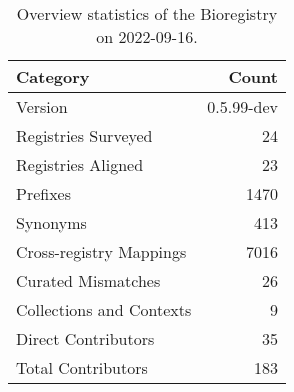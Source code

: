 \begin{table}
\centering
\caption{Overview statistics of the Bioregistry on 2022-09-16.}
\label{tab:bioregistry-summary}
\begin{tabular}{lr}
\toprule
                Category &      Count \\
\midrule
                 Version & 0.5.99-dev \\
     Registries Surveyed &         24 \\
      Registries Aligned &         23 \\
                Prefixes &       1470 \\
                Synonyms &        413 \\
 Cross-registry Mappings &       7016 \\
      Curated Mismatches &         26 \\
Collections and Contexts &          9 \\
     Direct Contributors &         35 \\
      Total Contributors &        183 \\
\bottomrule
\end{tabular}
\end{table}
